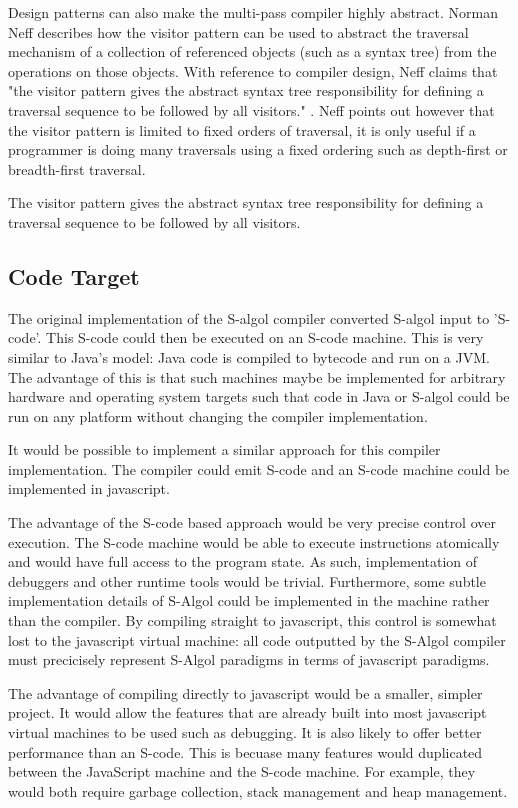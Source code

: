 \documentclass{article}
\begin{document}
Design patterns can also make the multi-pass compiler highly abstract. Norman Neff describes how the visitor pattern can be used to abstract the traversal mechanism of a collection of referenced objects (such as a syntax tree) from the operations on those objects. With reference to compiler design, Neff claims that "the visitor pattern gives the abstract syntax tree responsibility for defining a traversal sequence to be followed by all visitors." \cite{neff1999oo}. Neff points out however that the visitor pattern is limited to fixed orders of traversal, it is only useful if a programmer is doing many traversals using a fixed ordering such as depth-first or breadth-first traversal. 

The visitor pattern gives the abstract syntax tree responsibility for defining a traversal sequence to be followed by all visitors.

\subsection{Code Target}

The original implementation of the S-algol compiler converted S-algol input to 'S-code'. This S-code could then be executed on an S-code machine. This is very similar to Java's model: Java code is compiled to bytecode and run on a JVM. The advantage of this is that such machines maybe be implemented for arbitrary hardware and operating system targets such that code in Java or S-algol could be run on any platform without changing the compiler implementation.

It would be possible to implement a similar approach for this compiler implementation. The compiler could emit S-code and an S-code machine could be implemented in javascript.

The advantage of the S-code based approach would be very precise control over execution. The S-code machine would be able to execute instructions atomically and would have full access to the program state. As such, implementation of debuggers and other runtime tools would be trivial. Furthermore, some subtle implementation details of S-Algol could be implemented in the machine rather than the compiler. By compiling straight to javascript, this control is somewhat lost to the javascript virtual machine: all code outputted by the S-Algol compiler must precicisely represent S-Algol paradigms in terms of javascript paradigms.

The advantage of compiling directly to javascript would be a smaller, simpler project. It would allow the features that are already built into most javascript virtual machines to be used such as debugging. It is also likely to offer better performance than an S-code. This is becuase many features would duplicated between the JavaScript machine and the S-code machine. For example, they would both require garbage collection, stack management and heap management.
\end{document}
